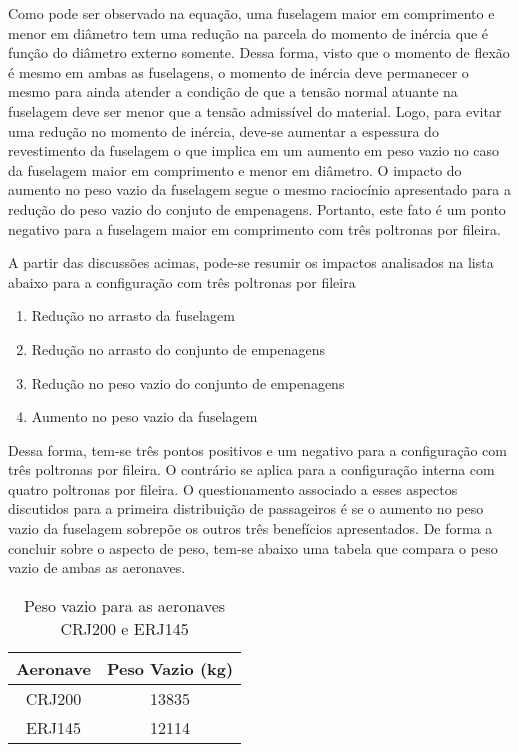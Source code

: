 Como pode ser observado na equação, uma fuselagem maior em comprimento e menor em diâmetro tem uma redução na parcela do momento de inércia que é função do diâmetro externo somente.
Dessa forma, visto que o momento de flexão é mesmo em ambas as fuselagens, o momento de inércia deve permanecer o mesmo para ainda atender a condição de que a tensão normal atuante na fuselagem deve ser menor que a tensão admissível do material.
Logo, para evitar uma redução no momento de inércia, deve-se aumentar a espessura do revestimento da fuselagem o que implica em um aumento em peso vazio no caso da fuselagem maior em comprimento e menor em diâmetro.
O impacto do aumento no peso vazio da fuselagem segue o mesmo raciocínio apresentado para a redução do peso vazio do conjuto de empenagens.
Portanto, este fato é um ponto negativo para a fuselagem maior em comprimento com três poltronas por fileira. 

A partir das discussões acimas, pode-se resumir os impactos analisados na lista abaixo para a configuração com três poltronas por fileira

\begin{enumerate}
	\item Redução no arrasto da fuselagem 
    \item Redução no arrasto do conjunto de empenagens
    \item Redução no peso vazio do conjunto de empenagens
    \item Aumento no peso vazio da fuselagem
\end{enumerate}

Dessa forma, tem-se três pontos positivos e um negativo para a configuração com três poltronas por fileira.
O contrário se aplica para a configuração interna com quatro poltronas por fileira.
O questionamento associado a esses aspectos discutidos para a primeira distribuição de passageiros é se o aumento no peso vazio da fuselagem sobrepõe os outros três benefícios apresentados.
De forma a concluir sobre o aspecto de peso, tem-se abaixo uma tabela que compara o peso vazio de ambas as aeronaves.

\begin{table}[H]
\centering
\begin{tabular}{cc}
\toprule
Aeronave & Peso Vazio (kg) \\ \midrule
CRJ200 & 13835 \\
ERJ145 & 12114 \\
\bottomrule
\end{tabular}
\caption[Peso Vazio das Aeronaves em Análise]{Peso vazio para as aeronaves CRJ200 e ERJ145}
\label{tbl:pesovazio_fus}
\end{table}

